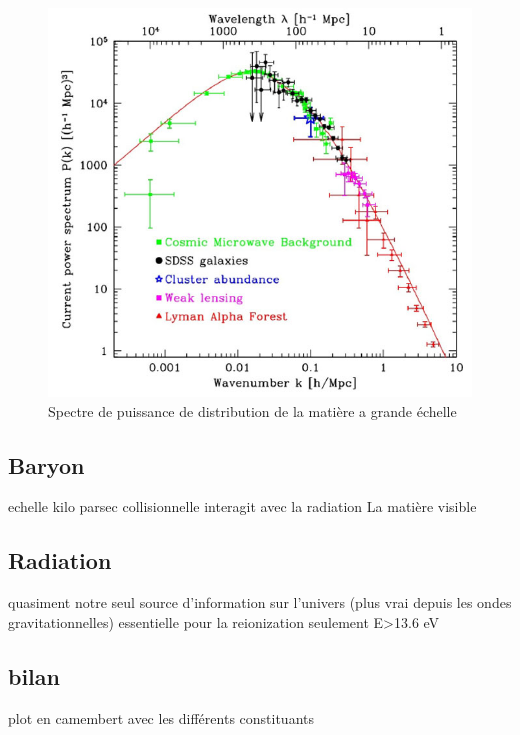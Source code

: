 \begin{figure}[bth]
        \includegraphics[width=.95\linewidth]{img/01/matter_power_spectrum.jpeg} 
        \caption{Spectre de puissance de distribution de la matière a grande échelle
        }
 		\label{fig:matter_power_spectrum}
\end{figure}



\subsection{Baryon}

echelle kilo parsec
collisionnelle
interagit avec la radiation
La matière visible

\subsection{Radiation}

quasiment notre seul source d'information sur l'univers (plus vrai depuis les ondes gravitationnelles)
essentielle pour la reionization
seulement E>13.6 eV

\subsection{bilan}

plot en camembert avec les différents constituants






